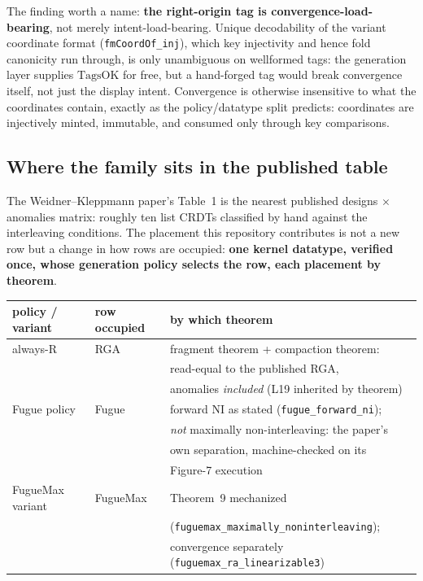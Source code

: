 \documentclass[11pt]{article}
\newcommand{\lean}[1]{\texttt{#1}}
\begin{document}
\noindent The finding worth a name: \textbf{the right-origin tag is
convergence-load-bearing}, not merely intent-load-bearing. Unique
decodability of the variant coordinate format
(\lean{fmCoordOf\_inj}), which key injectivity and hence fold
canonicity run through, is only unambiguous on wellformed tags: the
generation layer supplies $\mathrm{TagsOK}$ for free, but a
hand-forged tag would break convergence itself, not just the display
intent. Convergence is otherwise insensitive to what the coordinates
contain, exactly as the policy/datatype split predicts: coordinates
are injectively minted, immutable, and consumed only through key
comparisons.

\subsection{Where the family sits in the published table}
\label{sec:table1}

The Weidner--Kleppmann paper's Table~1 is the nearest published designs
$\times$ anomalies matrix: roughly ten list CRDTs classified by hand
against the interleaving conditions. The placement this repository
contributes is not a new row but a change in how rows are occupied:
\textbf{one kernel datatype, verified once, whose generation policy
selects the row, each placement by theorem}.

\begin{center}\small
\begin{tabular}{@{}lll@{}}
\toprule
policy / variant & row occupied & by which theorem \\
\midrule
always-R & RGA & fragment theorem + compaction theorem: \\
 & & read-equal to the published RGA, \\
 & & anomalies \emph{included} (L19 inherited by theorem) \\
Fugue policy & Fugue & forward NI as stated
  (\lean{fugue\_forward\_ni}); \\
 & & \emph{not} maximally non-interleaving: the paper's \\
 & & own separation, machine-checked on its \\
 & & Figure-7 execution \\
FugueMax variant & FugueMax & Theorem~9 mechanized \\
 & & (\lean{fuguemax\_maximally\_noninterleaving}); \\
 & & convergence separately
  (\lean{fuguemax\_ra\_linearizable3}) \\
\bottomrule
\end{tabular}
\end{center}
\end{document}
